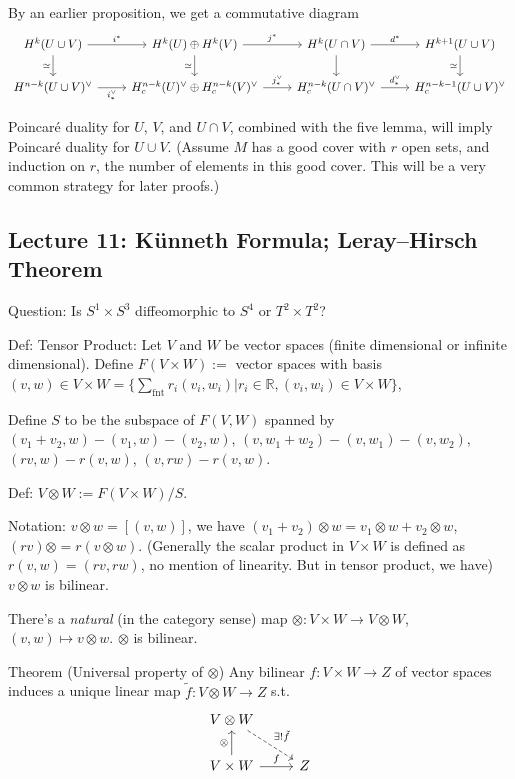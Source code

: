 \documentclass{article}
\theoremstyle{mystyle}
\theoremstyle{remark}
\numberwithin{equation}{section}
\begin{document}
By an earlier proposition, we get a commutative diagram
$$
\begin{tikzcd}
H^k(U\cup V) \ar[d,"\simeq"']\ar[r,"i^*"] & H^k(U)\oplus H^k(V)\ar[r,"j^*"]\ar[d,"\simeq"']
 & H^k(U\cap V) \ar[r,"d^*"] \ar[d] & H^{k+1}(U\cup V) \ar[d,"\simeq"']\\
H^{n-k}(U\cup V)^\vee \ar[r,"i_*^\vee"'] & H^{n-k}_c(U)^\vee\oplus H^{n-k}_c(V)^\vee \ar[r,"j_*^\vee"] & H^{n-k}_c(U\cap V)^\vee  \ar[r,"d_*^\vee"] &
H^{n-k-1}_c(U\cup V)^\vee
\end{tikzcd}
$$

Poincar\'e duality for $U$, $V$, and $U\cap V$, combined with the five lemma, will imply Poincar\'e duality for $U\cup V$. (Assume $M$ has a good cover with $r$ open sets, and induction on $r$, the number of elements in this good cover. This will be a very common strategy for later proofs.)








\subsection{Lecture 11: Künneth Formula; Leray--Hirsch Theorem}

Question: Is $S^1\times S^3$ diffeomorphic to $S^4$ or $T^2\times T^2$?

Def: Tensor Product: Let $V$ and $W$ be vector spaces (finite dimensional or infinite dimensional). Define $F(V\times W):=$ vector spaces with basis $(v,w)\in V\times W = \{\sum_{\text{fnt}}r_i(v_i,w_i)|r_i\in \mathbb{R},(v_i,w_i) \in V\times W\}$,

Define $S$ to be the subspace of $F(V,W)$ spanned by $(v_1+v_2,w)-(v_1,w)-(v_2,w)$, $(v,w_1+w_2)-(v,w_1)-(v,w_2)$, $(rv,w)-r(v,w)$, $(v,rw)-r(v,w)$.

Def: $V\otimes W := F(V\times W)/S$. 

Notation: $v\otimes w = [(v,w)]$, we have $(v_1+v_2)\otimes w = v_1\otimes w+v_2\otimes w$, $(rv)\otimes = r(v\otimes w)$. (Generally the scalar product in $V\times W$ is defined as $r(v,w) = (rv,rw)$, no mention of linearity. But in tensor product, we have) $v\otimes w$ is bilinear. 

There's a \emph{natural} (in the category sense) map $\otimes \colon V\times W\rightarrow V\otimes W$, $(v,w)\mapsto v\otimes w$. $\otimes$ is bilinear.

Theorem (Universal property of $\otimes$) Any bilinear $f\colon V\times W\rightarrow Z$ of vector spaces induces a unique linear map $\tilde{f}\colon V\otimes W\rightarrow Z$ s.t.
$$
\begin{tikzcd}
V\otimes W  \ar[dashed, dr,"\exists! \tilde{f}"] &\\ V\times W\ar[u,"\otimes"] \ar[r,"f"] &  Z
\end{tikzcd}
$$
\end{document}
